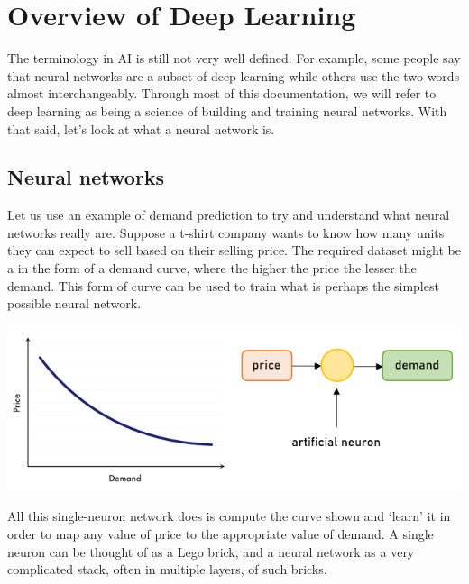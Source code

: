 \documentclass{article}[a4paper,12pt]
\theoremstyle{definition}
\begin{document}
\hrulefill
\pagebreak
\section{Overview of Deep Learning}
The terminology in AI is still not very well defined. For example, some people say that neural networks are a subset of deep learning while others use the two words almost interchangeably. Through most of this documentation, we will refer to deep learning as being a science of building and training neural networks. With that said, let's look at what a neural network is.
\subsection{Neural networks}
Let us use an example of demand prediction to try and understand what neural networks really are. Suppose a t-shirt company wants to know how many units they can expect to sell based on their selling price. The required dataset might be a in the form of a demand curve, where the higher the price the lesser the demand. This form of curve can be used to train what is perhaps the simplest possible neural network.
\begin{center}\includegraphics{deep_learning1.png}\end{center}
All this single-neuron network does is compute the curve shown and `learn' it in order to map any value of price to the appropriate value of demand. A single neuron can be thought of as a Lego brick, and a neural network as a very complicated stack, often in multiple layers, of such bricks.
\vspace{6pt}
\end{document}

